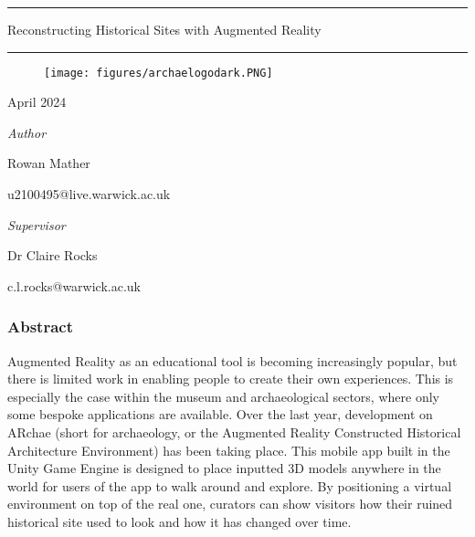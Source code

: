\documentclass[12pt, a4paper]{article}
\begin{document}

\begin{titlepage}
\centering
    \centering
    \vspace*{1cm}

    \hrule
    \vspace*{1cm}  
    {\huge Reconstructing Historical Sites with Augmented Reality}
    \vspace*{1 cm}  
    \hrule
    
    \vspace*{2.2cm}  

    \begin{figure}[H]
    \centering
        \texttt{[image: figures/archaelogodark.PNG]}
    \end{figure}

    \vspace*{1.5cm}  
        {
    \Large
    April 2024
    }
    \vspace*{2.2cm} 
    
    \begin{minipage}{.48\textwidth}
        \large
        \raggedright
        \textit{Author} \par 
        Rowan Mather \par u2100495@live.warwick.ac.uk
    \end{minipage}
    \begin{minipage}{.02\textwidth}
    \hspace{1pt}
    \end{minipage}
    \begin{minipage}{.48\textwidth}
        \raggedleft
        \large
        \textit{Supervisor} \par 
        Dr Claire Rocks \par c.l.rocks@warwick.ac.uk
    \end{minipage} 
            
\end{titlepage}

\newpage

\vspace*{1cm}

\begin{center}
\subsubsection*{Abstract}
\end{center}
Augmented Reality as an educational tool is becoming increasingly popular, but there is limited work in enabling people to create their own experiences. This is especially the case within the museum and archaeological sectors, where only some bespoke applications are available. Over the last year, development on ARchae (short for archaeology, or the Augmented Reality Constructed Historical Architecture Environment) has been taking place. This mobile app built in the Unity Game Engine is designed to place inputted 3D models anywhere in the world for users of the app to walk around and explore. By positioning a virtual environment on top of the real one, curators can show visitors how their ruined historical site used to look and how it has changed over time.
\end{document}
